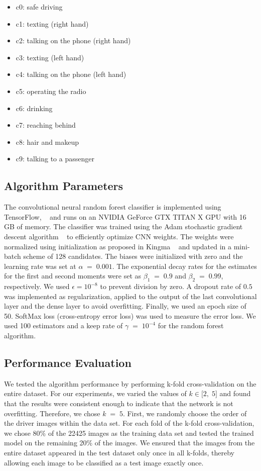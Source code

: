 \begin{itemize}
  \item \relax c0: safe driving
  \item \relax c1: texting (right hand)
  \item \relax c2: talking on the phone (right hand)
  \item \relax c3: texting (left hand)
  \item \relax c4: talking on the phone (left hand)
  \item \relax c5: operating the radio
  \item \relax c6: drinking
  \item \relax c7: reaching behind
  \item \relax c8: hair and makeup
  \item \relax c9: talking to a passenger
\end{itemize}



\subsection{Algorithm Parameters}The convolutional neural random forest classifier is implemented using TensorFlow, \unskip~\cite{1641075:26775853} and runs on an NVIDIA GeForce GTX TITAN X GPU with 16 GB of memory. The classifier was trained using the Adam stochastic gradient descent algorithm \unskip~\cite{1641075:26775857} to efficiently optimize CNN weights. The weights were normalized using initialization as proposed in Kingma \unskip~\cite{1641075:26775857} and updated in a mini-batch scheme of 128 candidates. The biases were initialized with zero and the learning rate was set at $\alpha\;=\;0.001 $. The exponential decay rates for the estimates for the first and second moments were set as $\beta_1\;=\;0.9 $ and $\beta_2\;=\;0.99 $, respectively. We used $\epsilon={10}^{-8} $ to prevent division by zero. A dropout rate of $0.5 $ was implemented as regularization, applied to the output of the last convolutional layer and the dense layer to avoid overfitting. Finally, we used an epoch size of 50.  SoftMax loss (cross-entropy error loss) was used to measure the error loss. We used 100 estimators and a keep rate of $\gamma\;=\;{10}^{-4} $ for the random forest algorithm.


\subsection{Performance Evaluation} We tested the algorithm performance by performing k-fold cross-validation on the entire dataset. For our experiments, we varied the values of $k\in\lbrack2,\;5\rbrack $ and found that the results were consistent enough to indicate that the network is not overfitting. Therefore, we chose $k\;=\;5 $. First, we randomly choose the order of the driver images within the data set. For each fold of the k-fold cross-validation, we chose 80\% of the 22425 images as the training data set and tested the trained model on the remaining 20\% of the images. We ensured that the images from the entire dataset appeared in the test dataset only once in all k-folds, thereby allowing each image to be classified as a test image exactly once.

